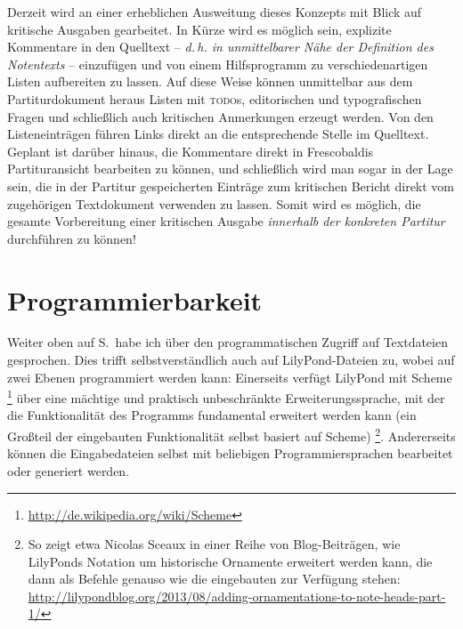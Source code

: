 \documentclass[DIV=12]{scrreprt}
\begin{document}
Derzeit wird an einer erheblichen Ausweitung dieses Konzepts mit Blick auf kritische Ausgaben gearbeitet.
In Kürze wird es möglich sein, explizite Kommentare in den Quelltext -- \emph{d.\,h. in unmittelbarer Nähe der Definition des Notentexts} -- einzufügen und von einem Hilfsprogramm zu verschiedenartigen Listen aufbereiten zu lassen.
Auf diese Weise können unmittelbar aus dem Partiturdokument heraus Listen mit \textsc{todo}s, editorischen und typografischen Fragen und schließlich auch kritischen Anmerkungen erzeugt werden.
Von den Listeneinträgen führen Links direkt an die entsprechende Stelle im Quelltext.
Geplant ist darüber hinaus, die Kommentare direkt in Frescobaldis Partituransicht bearbeiten zu können, und schließlich wird man sogar in der Lage sein, die in der Partitur gespeicherten Einträge zum kritischen Bericht direkt vom zugehörigen Textdokument verwenden zu lassen.
Somit wird es möglich, die gesamte Vorbereitung einer kritischen Ausgabe \emph{innerhalb der konkreten Partitur} durchführen zu können!

\section{Programmierbarkeit}
\label{sec:pt_lilypond-programmability}
Weiter oben auf S.\,\pageref{sec:pt_programmability} habe ich über den programmatischen Zugriff auf Textdateien gesprochen.
Dies trifft selbstverständlich auch auf LilyPond-Dateien zu, wobei auf zwei Ebenen programmiert werden kann:
Einerseits verfügt LilyPond mit Scheme%
\footnote{\url{http://de.wikipedia.org/wiki/Scheme}}
über eine mächtige und praktisch unbeschränkte Erweiterungssprache, mit der die Funktionalität des Programms fundamental erweitert werden kann (ein Großteil der eingebauten Funktionalität selbst basiert auf Scheme)%
\footnote{So zeigt etwa Nicolas Sceaux in einer Reihe von Blog-Beiträgen, wie LilyPonds Notation um historische Ornamente erweitert werden kann, die dann als Befehle genauso wie die eingebauten zur Verfügung stehen: \url{http://lilypondblog.org/2013/08/adding-ornamentations-to-note-heads-part-1/}}.
Andererseits können die Eingabedateien selbst mit beliebigen Programmiersprachen bearbeitet oder generiert werden.
\end{document}
